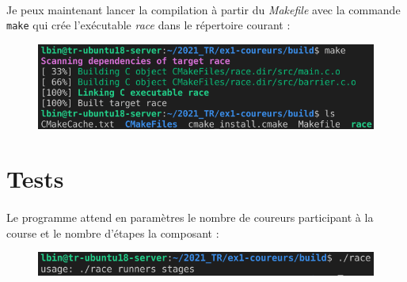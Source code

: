\documentclass{article}
\begin{document}
    \paragraph{}
    Je peux maintenant lancer la compilation à partir du \emph{Makefile} avec la commande \texttt{make} qui crée l'exécutable \emph{race} dans le répertoire courant :
    \begin{figure}[H]
        \centering
        \includegraphics[width=.6\textwidth]{./screenshots/make.png}
    \end{figure}


    \newpage
    \section{Tests}
    \paragraph{}
    Le programme attend en paramètres le nombre de coureurs participant à la course et le nombre d'étapes la composant :
    \begin{figure}[H]
        \centering
        \includegraphics[width=.6\textwidth]{./screenshots/params.png}
    \end{figure}
    
\end{document}
